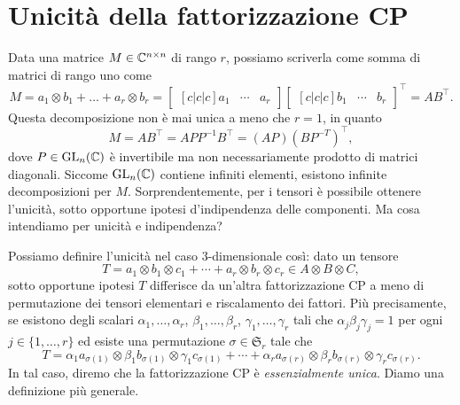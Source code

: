 \chapter{Unicità della fattorizzazione CP}
\label{cp:cp_uniqueness}

Data una matrice $ M \in \mathbb{C}^{n\times n} $ di rango $ r $, possiamo scriverla come somma di matrici di rango uno come
\begin{equation*}
	M = a_1 \otimes b_1 + \ldots + a_{r} \otimes b_{r} = \begin{bmatrix}[c|c|c] a_1 & \cdots & a_{r}
	\end{bmatrix} \begin{bmatrix}[c|c|c] b_1 & \cdots & b_{r} \end{bmatrix}^{\top} = AB^{\top}.
\end{equation*}
Questa decomposizione non è mai unica a meno che $ r =1 $, in quanto
\begin{equation}
	\label{eq:matrix_non_uniqueness}
	M = AB^{\top} = APP^{-1}B^{\top} = (AP)(BP^{-T})^{\top},
\end{equation}
dove $ P \in \operatorname{GL}_{n}(\mathbb{C})$ è invertibile ma non necessariamente prodotto di matrici diagonali. Siccome $
	\operatorname{GL}_{n}(\mathbb{C}) $ contiene infiniti elementi, esistono infinite decomposizioni per $ M $.
Sorprendentemente, per i tensori è possibile ottenere l'unicità, sotto opportune ipotesi
d'indipendenza delle componenti. Ma cosa intendiamo per unicità e indipendenza?

Possiamo definire l'unicità nel caso $ 3 $-dimensionale così: dato un tensore
\begin{equation*}
	T = a_1 \otimes b_1 \otimes c_1 + \cdots + a_{r} \otimes b_{r} \otimes c_{r} \in A \otimes B
	\otimes C,
\end{equation*}
sotto opportune ipotesi $ T $ differisce da un'altra fattorizzazione CP a meno di permutazione dei tensori
elementari e
riscalamento dei fattori. Più precisamente, se
esistono degli scalari $ \alpha_1, \ldots, \alpha_{r}$, $\beta_1, \ldots, \beta_{r}$, $\gamma_1, \ldots,
	\gamma_{r}$ tali che $ \alpha_j \beta_{j} \gamma_{j} =1 $ per ogni $ j \in \{1, \ldots, r\}  $ ed
esiste una permutazione $ \sigma \in \mathfrak{S}_{r} $ tale che
\begin{equation*}
	T = \alpha_1 a_{\sigma(1)} \otimes \beta_1 b_{\sigma(1)} \otimes \gamma_{1} c_{\sigma(1)} +
	\cdots + \alpha_r a_{\sigma(r)} \otimes \beta_r b_{\sigma(r)} \otimes \gamma_{r} c_{\sigma(r)}.
\end{equation*}
In tal caso, diremo che la fattorizzazione CP è \emph{essenzialmente unica}.
Diamo una definizione più generale.

